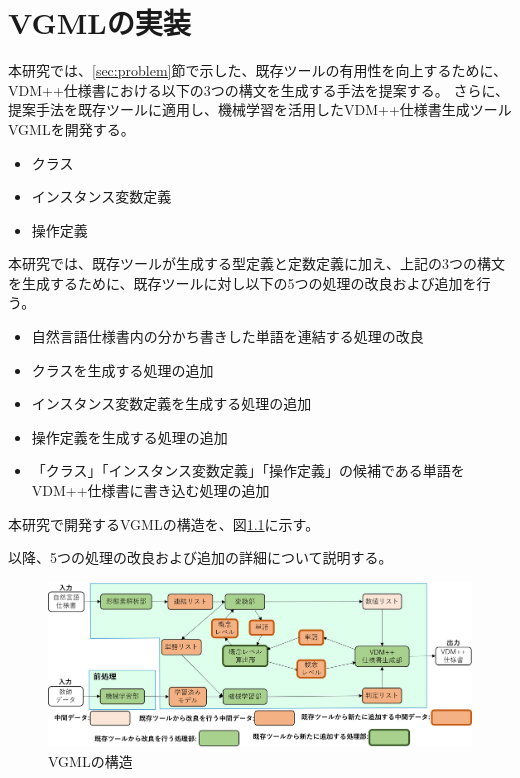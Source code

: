 \chapter{VGMLの実装}\label{cha:Implementation}

本研究では、\ref{sec:problem}節で示した、既存ツールの有用性を向上するために、VDM++仕様書における以下の3つの構文を生成する手法を提案する。
さらに、提案手法を既存ツールに適用し、機械学習を活用したVDM++仕様書生成ツールVGMLを開発する。

\begin{itemize}
    \item クラス
    \item インスタンス変数定義
    \item 操作定義
\end{itemize}

本研究では、既存ツールが生成する型定義と定数定義に加え、上記の3つの構文を生成するために、既存ツールに対し以下の5つの処理の改良および追加を行う。

\begin{itemize}
    \item 自然言語仕様書内の分かち書きした単語を連結する処理の改良
    \item クラスを生成する処理の追加
    \item インスタンス変数定義を生成する処理の追加
    \item 操作定義を生成する処理の追加
    \item 「クラス」「インスタンス変数定義」「操作定義」の候補である単語をVDM++仕様書に書き込む処理の追加
\end{itemize}

本研究で開発するVGMLの構造を、図\ref{fig:vgml_structure}に示す。

以降、5つの処理の改良および追加の詳細について説明する。

\begin{figure}[t]
    \begin{center}
        \includegraphics[width=1.0\columnwidth]{image/vgml_structure.png}
        \caption{VGMLの構造}
        \label{fig:vgml_structure}
    \end{center}
\end{figure}

